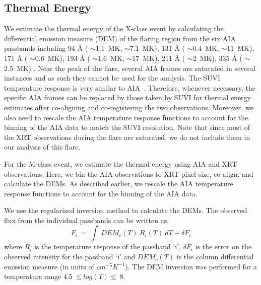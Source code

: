 \subsection{Thermal Energy}\label{sec:therm}

We estimate the thermal energy of the X-class event by calculating the differential emission measure (DEM) of the flaring region from the six AIA passbands including 94 {\AA} ( $\sim$1.1~MK,  $\sim$7.1~MK), 131 {\AA} ( $\sim$0.4~MK,  $\sim$11~MK), 171 {\AA} ( $\sim$0.6~MK), 193 {\AA} ( $\sim$1.6~MK,  $\sim$17~MK), 211 {\AA} ( $\sim$2~MK), 335 {\AA} ( $\sim$2.5~MK) \citep{o'dwyer10,O'Dwyer12}. Near the peak of the flare, several AIA frames are saturated in several instances and as such they cannot be used for the analysis. The SUVI temperature response is very similar to AIA~\citep{suvi}. Therefore, whenever necessary, the specific AIA frames can be replaced by those taken by SUVI for thermal energy estimates after co-aligning and co-registering  the two observations. Moreover, we also need to rescale the AIA temperature response functions to account for the binning of the AIA data to match the SUVI resolution. Note that since most of the XRT observations during the flare are saturated, we do not include them in our analysis of this flare.

For the M-class event, we estimate the thermal energy using AIA and XRT observations. Here, we bin the AIA observations to XRT pixel size, co-align, and calculate the DEMs. As described earlier, we rescale the AIA temperature response functions to account for the binning of the AIA data.

We use the regularized inversion method \citep{hannah&kontar12} to calculate the DEMs. The observed flux from the individual passbands can be written as,
\begin{equation}
    F_{i}~=~\int~DEM_{c}(T)~R_{i}(T)~dT+\delta F_{i}
\end{equation}
where $R_{i}$ is the temperature response of the passband `i', $\delta F_{i}$ is the error on the observed intensity for the passband `i' and $DEM_{c}(T)$ is the column differential emission measure (in units of $cm^{-5}K^{-1}$). The DEM inversion was performed for a temperature range $4.5~\le log(T)\le~8$.

